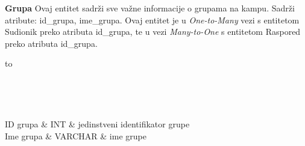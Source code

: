 				\textbf{Grupa}	Ovaj entitet sadrži sve važne informacije o grupama na kampu. Sadrži atribute: id\_grupa, ime\_grupa. Ovaj entitet je u \textit{One-to-Many} vezi s entitetom Sudionik preko atributa id\_grupa, te u vezi \textit{Many-to-One} s entitetom Raspored preko atributa id\_grupa.
				
				\begin{longtabu} to \textwidth {|X[6, l]|X[6, l]|X[20, l]|}
					
					\hline {}	 \\[3pt] \hline
					\endfirsthead
					
					\hline {}	 \\[3pt] \hline
					\endhead
					
					\hline 
					\endlastfoot
					
					ID grupa & INT	& jedinstveni identifikator grupe 		\\ \hline
					Ime grupa	& VARCHAR & ime grupe   	\\ \hline 
					
				\end{longtabu}
			
